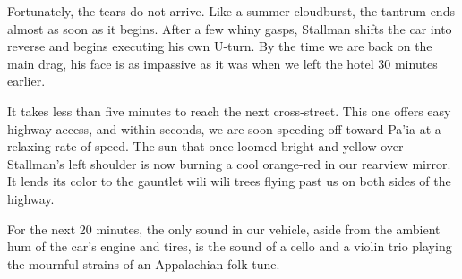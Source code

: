 Fortunately, the tears do not arrive. Like a summer cloudburst, the tantrum ends almost as soon as it begins. After a few whiny gasps, Stallman shifts the car into reverse and begins executing his own U-turn. By the time we are back on the main drag, his face is as impassive as it was when we left the hotel 30 minutes earlier.

It takes less than five minutes to reach the next cross-street. This one offers easy highway access, and within seconds, we are soon speeding off toward Pa'ia at a relaxing rate of speed. The sun that once loomed bright and yellow over Stallman's left shoulder is now burning a cool orange-red in our rearview mirror. It lends its color to the gauntlet wili wili trees flying past us on both sides of the highway.

For the next 20 minutes, the only sound in our vehicle, aside from the ambient hum of the car's engine and tires, is the sound of a cello and a violin trio playing the mournful strains of an Appalachian folk tune.

\theendnotes
\setcounter{endnote}{0}
